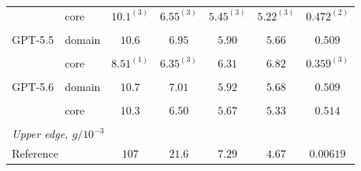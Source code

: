 \begin{table}[H]
\begin{tabular}{ll*{5}{c}}
 & core & \cellcolor{llpC}$10.1^{(3)}$ & \cellcolor{llpC}$6.55^{(3)}$ & \cellcolor{llpC}$5.45^{(3)}$ & \cellcolor{llpC}$5.22^{(3)}$ & \cellcolor{llpB}$0.472^{(2)}$ \\
 &  & \cellcolor{llpC}{\scriptsize$[9.39,\,17.5]$} & \cellcolor{llpC}{\color{llpSpread}{\scriptsize$[6.15,\,12.8]$}} & \cellcolor{llpC}{\color{llpSpread}{\scriptsize$[5.15,\,11.2]$}} & \cellcolor{llpC}{\color{llpSpread}{\scriptsize$[4.90,\,10.7]$}} & \cellcolor{llpB}{\scriptsize$[0.438,\,0.505]$} \\[2pt]
GPT-5.5 & domain & \cellcolor{llpC}$10.6$ & \cellcolor{llpC}$6.95$ & \cellcolor{llpC}$5.90$ & \cellcolor{llpC}$5.66$ & \cellcolor{llpA}$0.509$ \\
 &  & \cellcolor{llpC}{\scriptsize$[10.6,\,10.7]$} & \cellcolor{llpC}{\scriptsize$[6.92,\,7.07]$} & \cellcolor{llpC}{\scriptsize$[5.85,\,5.90]$} & \cellcolor{llpC}{\scriptsize$[5.62,\,5.67]$} & \cellcolor{llpA}{\scriptsize$[0.507,\,0.510]$} \\[2pt]
 & core & \cellcolor{llpA}$8.51^{(1)}$ & \cellcolor{llpC}$6.35^{(3)}$ & \cellcolor{llpD}$6.31$ & \cellcolor{llpD}$6.82$ & \cellcolor{llpD}$0.359^{(3)}$ \\
 &  & \cellcolor{llpA} & \cellcolor{llpC}{\scriptsize$[5.62,\,11.2]$} & \cellcolor{llpD}{\color{llpSpread}{\scriptsize$[4.42,\,12.4]$}} & \cellcolor{llpD}{\color{llpSpread}{\scriptsize$[4.06,\,10.6]$}} & \cellcolor{llpD}{\color{llpSpread}{\scriptsize$[0.264,\,0.683]$}} \\[2pt]
GPT-5.6 & domain & \cellcolor{llpC}$10.7$ & \cellcolor{llpC}$7.01$ & \cellcolor{llpC}$5.92$ & \cellcolor{llpC}$5.68$ & \cellcolor{llpA}$0.509$ \\
 &  & \cellcolor{llpC}{\scriptsize$[10.6,\,10.7]$} & \cellcolor{llpC}{\scriptsize$[6.95,\,7.07]$} & \cellcolor{llpC}{\scriptsize$[5.90,\,5.93]$} & \cellcolor{llpC}{\scriptsize$[5.65,\,5.69]$} & \cellcolor{llpA}{\scriptsize$[0.506,\,0.513]$} \\[2pt]
 & core & \cellcolor{llpC}$10.3$ & \cellcolor{llpC}$6.50$ & \cellcolor{llpC}$5.67$ & \cellcolor{llpC}$5.33$ & \cellcolor{llpA}$0.514$ \\
 &  & \cellcolor{llpC}{\scriptsize$[9.47,\,15.6]$} & \cellcolor{llpC}{\scriptsize$[6.07,\,10.9]$} & \cellcolor{llpC}{\scriptsize$[5.04,\,9.45]$} & \cellcolor{llpC}{\scriptsize$[4.80,\,9.02]$} & \cellcolor{llpA}{\scriptsize$[0.425,\,0.691]$} \\
\midrule
\multicolumn{7}{l}{\textit{Upper edge, $g/10^{-3}$}} \\
\midrule
\multicolumn{2}{l}{Reference} & $107$ & $21.6$ & $7.29$ & $4.67$ & $0.00619$ \\[2pt]

\end{tabular}
\end{table}
